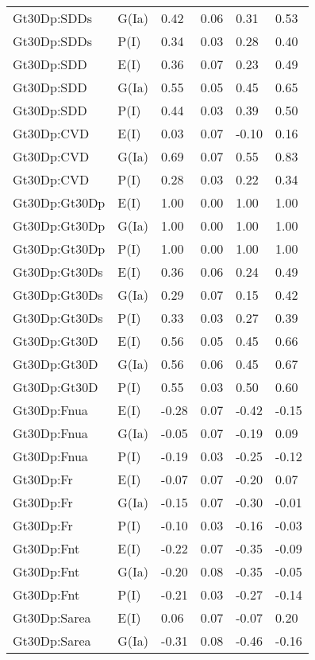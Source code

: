 \begin{center}
\begin{longtable}{|p{1.1in}|p{0.7in}|p{0.7in}|p{0.6in}|p{0.6in}|p{0.6in}|}
  Gt30Dp:SDDs & G(Ia) & 0.42 & 0.06 & 0.31 & 0.53 \\ 
  Gt30Dp:SDDs & P(I) & 0.34 & 0.03 & 0.28 & 0.40 \\ 
  Gt30Dp:SDD & E(I) & 0.36 & 0.07 & 0.23 & 0.49 \\ 
  Gt30Dp:SDD & G(Ia) & 0.55 & 0.05 & 0.45 & 0.65 \\ 
  Gt30Dp:SDD & P(I) & 0.44 & 0.03 & 0.39 & 0.50 \\ 
  Gt30Dp:CVD & E(I) & 0.03 & 0.07 & -0.10 & 0.16 \\ 
  Gt30Dp:CVD & G(Ia) & 0.69 & 0.07 & 0.55 & 0.83 \\ 
  Gt30Dp:CVD & P(I) & 0.28 & 0.03 & 0.22 & 0.34 \\ 
  Gt30Dp:Gt30Dp & E(I) & 1.00 & 0.00 & 1.00 & 1.00 \\ 
  Gt30Dp:Gt30Dp & G(Ia) & 1.00 & 0.00 & 1.00 & 1.00 \\ 
  Gt30Dp:Gt30Dp & P(I) & 1.00 & 0.00 & 1.00 & 1.00 \\ 
  Gt30Dp:Gt30Ds & E(I) & 0.36 & 0.06 & 0.24 & 0.49 \\ 
  Gt30Dp:Gt30Ds & G(Ia) & 0.29 & 0.07 & 0.15 & 0.42 \\ 
  Gt30Dp:Gt30Ds & P(I) & 0.33 & 0.03 & 0.27 & 0.39 \\ 
  Gt30Dp:Gt30D & E(I) & 0.56 & 0.05 & 0.45 & 0.66 \\ 
  Gt30Dp:Gt30D & G(Ia) & 0.56 & 0.06 & 0.45 & 0.67 \\ 
  Gt30Dp:Gt30D & P(I) & 0.55 & 0.03 & 0.50 & 0.60 \\ 
  Gt30Dp:Fnua & E(I) & -0.28 & 0.07 & -0.42 & -0.15 \\ 
  Gt30Dp:Fnua & G(Ia) & -0.05 & 0.07 & -0.19 & 0.09 \\ 
  Gt30Dp:Fnua & P(I) & -0.19 & 0.03 & -0.25 & -0.12 \\ 
  Gt30Dp:Fr & E(I) & -0.07 & 0.07 & -0.20 & 0.07 \\ 
  Gt30Dp:Fr & G(Ia) & -0.15 & 0.07 & -0.30 & -0.01 \\ 
  Gt30Dp:Fr & P(I) & -0.10 & 0.03 & -0.16 & -0.03 \\ 
  Gt30Dp:Fnt & E(I) & -0.22 & 0.07 & -0.35 & -0.09 \\ 
  Gt30Dp:Fnt & G(Ia) & -0.20 & 0.08 & -0.35 & -0.05 \\ 
  Gt30Dp:Fnt & P(I) & -0.21 & 0.03 & -0.27 & -0.14 \\ 
  Gt30Dp:Sarea & E(I) & 0.06 & 0.07 & -0.07 & 0.20 \\ 
  Gt30Dp:Sarea & G(Ia) & -0.31 & 0.08 & -0.46 & -0.16 \\ 

\end{longtable}
\end{center}
